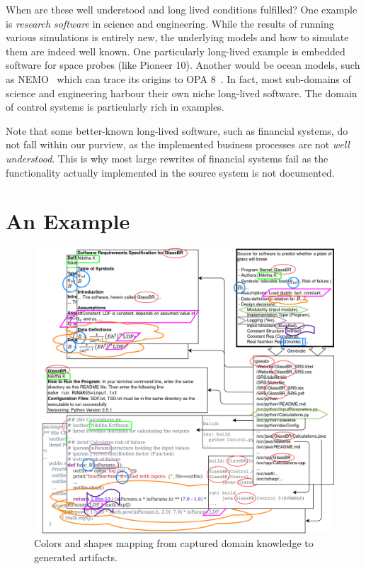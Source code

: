 \documentclass[a4paper,UKenglish,cleveref,autoref,thm-restate]{oasics-v2021}
\begin{document}
When are these well understood and long lived conditions fulfilled? One example
is \emph{research software} in science and engineering. While the results of
running various simulations is entirely new, the underlying models and how to
simulate them are indeed well known. One particularly long-lived example is
embedded software for space probes (like Pioneer 10). Another would be ocean
models, such as NEMO~\cite{madec_gurvan_2022_6334656} which can trace its
origins to OPA 8~\cite{Madec1998}. In fact, most sub-domains of science and
engineering harbour their own niche long-lived software. The domain of
control systems is particularly rich in examples.

Note that some better-known long-lived software, such as financial
systems, do not fall within our purview, as the implemented  business processes
are not \emph{well understood}. This is why most large rewrites of financial 
systems fail as the functionality actually implemented in the source system is
not documented.

\section{An Example}
\label{sec:example}

\begin{figure}[t]
  \centering
  \includegraphics[width=\linewidth]{assets/DrasilSupportsChange-right-portrait-overlapped-ungrouped-11ptFont-squished-blind-v1-300dpi.png}
  \caption{Colors and shapes mapping from captured domain knowledge to generated
  artifacts.}
  \label{Fig_DrasilAndChange}
\end{figure}
\end{document}
